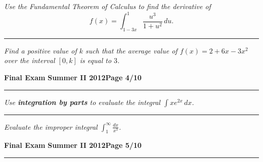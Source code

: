 \documentclass[12pt]{article}
\begin{document}
{\problem[5 pts] \em Use the Fundamental Theorem of Calculus to find the derivative of
 \begin{equation*}
f(x) = \int_{1-3x}^1 \frac{u^3}{1+u^2}\, du.
\end{equation*}
\vspace{6.5cm}
\begin{flushright}
\end{flushright}
\hrule
{\problem[5 pts] \em Find a positive value of $k$ such that the average value
of $f(x) = 2+6x-3x^2$ over the interval $[0,k]$ is equal to $3$.} 
\vspace{8cm}
\begin{flushright}
\end{flushright}
\newpage

\hfill{\large\bf Final Exam}\hfill{\large\bf
  Summer II 2012}\hfill{\large\bf Page 4/10}\hrule

\bigskip
{\problem[5 pts] \em Use \textbf{integration by parts} to evaluate the integral $\displaystyle{\int xe^{2x}\, dx}$.}
\vspace{6cm}
\begin{flushright}
\end{flushright}
\hrule
{\problem[5 pts] \em Evaluate the improper integral $\displaystyle{\int_1^\infty \frac{dx}{x^3}}$.}
\vspace{10cm}
\begin{flushright}
\end{flushright}
\newpage

\hfill{\large\bf Final Exam}\hfill{\large\bf
  Summer II 2012}\hfill{\large\bf Page 5/10}\hrule

}
\end{document}
